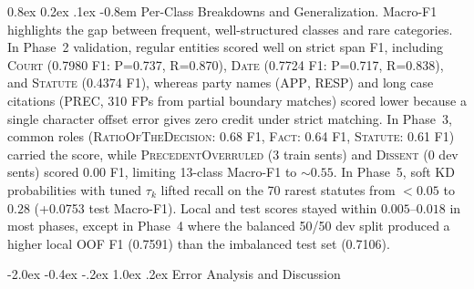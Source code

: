 \documentclass[11pt, oneside]{article}
\makeatletter
\renewcommand\section{\@startsection {section}{1}{\z@}%
  {-2.0ex \@plus -0.4ex \@minus -.2ex}%
  {1.0ex \@plus.2ex}%
  {\normalfont\Large\bfseries}}
\renewcommand\paragraph{\@startsection{paragraph}{4}{\z@}%
  {0.8ex \@plus0.2ex \@minus.1ex}%
  {-0.8em}%
  {\normalfont\normalsize\bfseries}}
\makeatother
\begin{document}
\paragraph{Per-Class Breakdowns and Generalization.}
Macro-F1 highlights the gap between frequent, well-structured classes and rare categories. In Phase~2 validation, regular entities scored well on strict span F1, including \textsc{Court} (0.7980 F1: P=0.737, R=0.870), \textsc{Date} (0.7724 F1: P=0.717, R=0.838), and \textsc{Statute} (0.4374 F1), whereas party names (\textsc{APP}, \textsc{RESP}) and long case citations (\textsc{PREC}, 310 FPs from partial boundary matches) scored lower because a single character offset error gives zero credit under strict matching. In Phase~3, common roles (\textsc{RatioOfTheDecision}: 0.68 F1, \textsc{Fact}: 0.64 F1, \textsc{Statute}: 0.61 F1) carried the score, while \textsc{PrecedentOverruled} (3 train sents) and \textsc{Dissent} (0 dev sents) scored 0.00 F1, limiting 13-class Macro-F1 to $\sim 0.55$. In Phase~5, soft KD probabilities with tuned $\tau_k$ lifted recall on the 70 rarest statutes from $<0.05$ to $0.28$ (+0.0753 test Macro-F1). Local and test scores stayed within $0.005\text{--}0.018$ in most phases, except in Phase~4 where the balanced 50/50 dev split produced a higher local OOF F1 (0.7591) than the imbalanced test set (0.7106).

\section{Error Analysis and Discussion}
\end{document}

